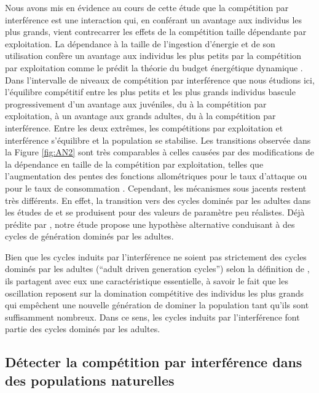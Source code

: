 Nous avons mis en évidence au cours de cette étude que la compétition par
interférence est une interaction qui, en conférant un avantage aux individus les
plus grands, vient contrecarrer les effets de la compétition taille dépendante
par exploitation. La dépendance à la taille de l'ingestion d'énergie et de son
utilisation confère un avantage aux individus les plus petits par la compétition
par exploitation \autocites{peters1986a,persson1998a,de-roos2013a} comme le
prédit la théorie du budget énergétique dynamique \autocites{kooijman2000a}.
Dans l'intervalle de niveaux de compétition par interférence que nous étudions
ici, l'équilibre compétitif entre les plus petits et les plus grands individus
bascule progressivement d'un avantage aux juvéniles, du à la compétition par
exploitation, à un avantage aux grands adultes, du à la compétition par
interférence. Entre les deux extrêmes, les compétitions par exploitation et
interférence s'équilibre et la population se stabilise. Les transitions observée
dans la Figure \ref{fig:AN2} sont très comparables à celles causées par des
modifications de la dépendance en taille de la compétition par exploitation,
telles que l'augmentation des pentes des fonctions allométriques pour le taux
d'attaque \autocites{persson1998a} ou pour le taux de consommation
\autocites{de-roos2003a}. Cependant, les mécanismes sous jacents restent très
différents. En effet, la transition vers des cycles dominés par les adultes dans
les études de \textcites{persson1998a} et \textcites{de-roos2003a} se produisent
pour des valeurs de paramètre peu réalistes. Déjà prédite par
\textcites{de-roos2003a}, notre étude propose une hypothèse alternative
conduisant à des cycles de génération dominés par les adultes.

Bien que les cycles induits par l'interférence ne soient pas strictement des
cycles dominés par les adultes (``adult driven generation cycles'') selon la
définition de \textcites{de-roos2003a}, ils partagent avec eux une
caractéristique essentielle, à savoir le fait que les oscillation reposent sur
la domination compétitive des individus les plus grands qui empêchent une
nouvelle génération de dominer la population tant qu'ils sont suffisamment
nombreux. Dans ce sens, les cycles induits par l'interférence font partie
des cycles dominés par les adultes.  

\subsection{Détecter la compétition par interférence dans des populations
naturelles} 

